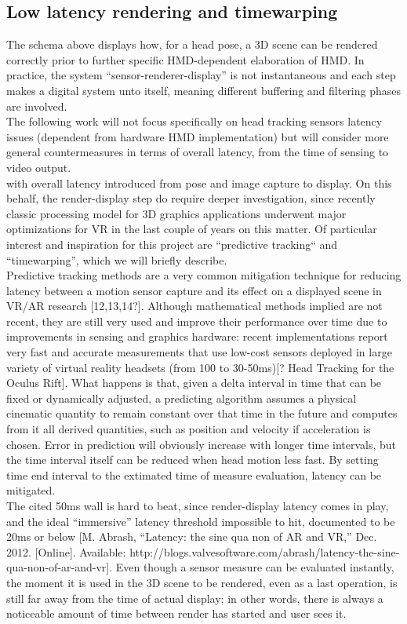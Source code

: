 \subsection{Low latency rendering and timewarping}
The schema above displays how, for a head pose, a 3D scene can be rendered correctly prior to further specific HMD-dependent elaboration of HMD. In practice, the system “sensor-renderer-display” is not instantaneous and each step makes a digital system unto itself, meaning different buffering and filtering phases are involved.\\
The following work will not focus specifically on head tracking sensors latency issues (dependent from hardware HMD implementation) but will consider more general countermeasures in terms of overall latency, from the time of sensing to video output.\\
with overall latency introduced from pose and image capture to display. On this behalf, the render-display step do require deeper investigation, since recently classic processing model for 3D graphics applications underwent major optimizations for VR in the last couple of years on this matter. Of particular interest and inspiration for this project are “predictive tracking“ and “timewarping”, which we will briefly describe.\\
Predictive tracking methods are a very common mitigation technique for reducing latency between a motion sensor capture and its effect on a displayed scene in VR/AR research [12,13,14?]. Although mathematical methods implied are not recent, they are still very used and improve their performance over time due to improvements in sensing and graphics hardware: recent implementations report very fast and accurate measurements that use low-cost sensors deployed in large variety of virtual reality headsets (from 100 to 30-50ms)[? Head Tracking for the Oculus Rift]. What happens is that, given a delta interval in time that can be fixed or dynamically adjusted, a predicting algorithm assumes a physical cinematic quantity to remain constant over that time in the future and computes from it all derived quantities, such as position and velocity if acceleration is chosen. Error in prediction will obviously increase with longer time intervals, but the time interval itself can be reduced when head motion less fast. By setting time end interval to the extimated time of measure evaluation, latency can be mitigated.\\
The cited 50ms wall is hard to beat, since render-display latency comes in play, and the ideal “immersive” latency threshold impossible to hit, documented to be 20ms or below [M. Abrash, “Latency: the sine qua non of AR and VR,” Dec. 2012. [Online]. Available: http://blogs.valvesoftware.com/abrash/latency-the-sine-qua-non-of-ar-and-vr]. Even though a sensor measure can be evaluated instantly, the moment it is used in the 3D scene to be rendered, even as a last operation, is still far away from the time of actual display; in other words, there is always a noticeable amount of time between render has started and user sees it.\\
